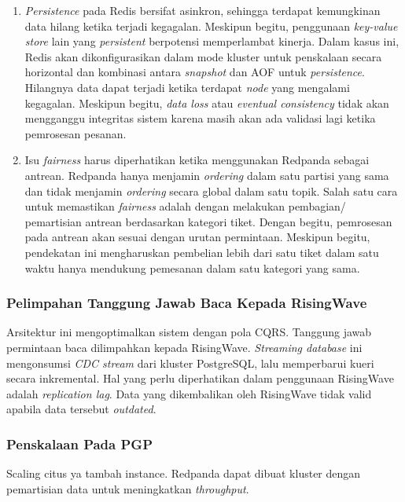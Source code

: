 \begin{enumerate}
    \item \textit{Persistence} pada Redis bersifat asinkron, sehingga terdapat kemungkinan data hilang ketika terjadi kegagalan. Meskipun begitu, penggunaan \textit{key-value store} lain yang \textit{persistent} berpotensi memperlambat kinerja. Dalam kasus ini, Redis akan dikonfigurasikan dalam mode kluster untuk penskalaan secara horizontal dan kombinasi antara \textit{snapshot} dan AOF untuk \textit{persistence}. Hilangnya data dapat terjadi ketika terdapat \textit{node} yang mengalami kegagalan. Meskipun begitu, \textit{data loss} atau \textit{eventual consistency} tidak akan mengganggu integritas sistem karena masih akan ada validasi lagi ketika pemrosesan pesanan.
    \item Isu \textit{fairness} harus diperhatikan ketika menggunakan Redpanda sebagai antrean. Redpanda hanya menjamin \textit{ordering} dalam satu partisi yang sama dan tidak menjamin \textit{ordering} secara global dalam satu topik. Salah satu cara untuk memastikan \textit{fairness} adalah dengan melakukan pembagian/ pemartisian antrean berdasarkan kategori tiket. Dengan begitu, pemrosesan pada antrean akan sesuai dengan urutan permintaan. Meskipun begitu, pendekatan ini mengharuskan pembelian lebih dari satu tiket dalam satu waktu hanya mendukung pemesanan dalam satu kategori yang sama.
\end{enumerate}

\subsubsection{Pelimpahan Tanggung Jawab Baca Kepada RisingWave}

Arsitektur ini mengoptimalkan sistem dengan pola CQRS. Tanggung jawab permintaan baca dilimpahkan kepada RisingWave. \textit{Streaming database} ini mengonsumsi \textit{CDC stream} dari kluster PostgreSQL, lalu memperbarui kueri secara inkremental. Hal yang perlu diperhatikan dalam penggunaan RisingWave adalah \textit{replication lag}. Data yang dikembalikan oleh RisingWave tidak valid apabila data tersebut \textit{outdated}.

\subsubsection{Penskalaan Pada PGP}

Scaling citus ya tambah instance. Redpanda dapat dibuat kluster dengan pemartisian data untuk meningkatkan \textit{throughput}.